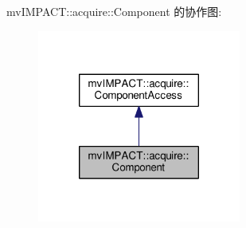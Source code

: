 mv\+I\+M\+P\+A\+C\+T\+:\+:acquire\+:\+:Component 的协作图\+:
\nopagebreak
\begin{figure}[H]
\begin{center}
\leavevmode
\includegraphics[width=190pt]{classmv_i_m_p_a_c_t_1_1acquire_1_1_component__coll__graph}
\end{center}
\end{figure}
